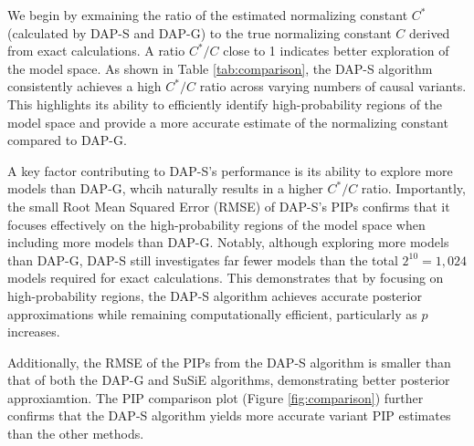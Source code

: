 \documentclass[pdflatex,sn-mathphys-num]{sn-jnl}%
\theoremstyle{thmstyleone}%
\theoremstyle{thmstyletwo}%
\theoremstyle{thmstylethree}%
\begin{document}
We begin by exmaining the ratio of the estimated normalizing constant $C^*$ (calculated by DAP-S and DAP-G) to the true normalizing constant $C$ derived from exact calculations. A ratio $C^*/C$ close to 1 indicates better exploration of the model space. As shown in Table \ref{tab:comparison}, the DAP-S algorithm consistently achieves a high $C^*/C$ ratio across varying numbers of causal variants. This highlights its ability to efficiently identify high-probability regions of the model space and provide a more accurate estimate of the normalizing constant compared to DAP-G.

A key factor contributing to DAP-S's performance is its ability to explore more models than DAP-G, whcih naturally results in a higher $C^*/C$ ratio. Importantly, the small Root Mean Squared Error (RMSE) of DAP-S's PIPs confirms that it focuses effectively on the high-probability regions of the model space when including more models than DAP-G. Notably, although exploring more models than DAP-G, DAP-S still investigates far fewer models than the total $2^{10}=1,024$ models required for exact calculations. This demonstrates that by focusing on high-probability regions, the DAP-S algorithm achieves accurate posterior approximations while remaining computationally efficient, particularly as $p$ increases.

Additionally, the RMSE of the PIPs from the DAP-S algorithm is smaller than that of both the DAP-G and SuSiE algorithms, demonstrating better posterior approxiamtion. The PIP comparison plot (Figure \ref{fig:comparison}) further confirms that the DAP-S algorithm yields more accurate variant PIP estimates than the other methods.
\end{document}
